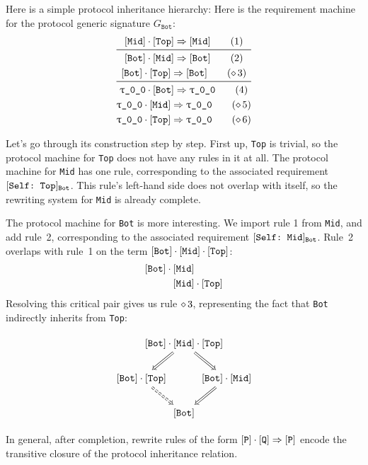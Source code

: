 \documentclass[../generics]{subfiles}
\begin{document}
\begin{example}\label{ex:protocol inheritance completion}
Here is a simple protocol inheritance hierarchy:
Here is the requirement machine for the protocol generic signature $G_{\texttt{Bot}}$:
\begin{gather*}
\ProtoInherit{Mid}{Top}\tag{1}\\
\midrule
\ProtoInherit{Bot}{Mid}\tag{2}\\
\ProtoInherit{Bot}{Top}\tag{$\CRule{3}$}\\
\midrule
\ProtoConf{\rT}{Bot}\tag{4}\\
\ProtoConf{\rT}{Mid}\tag{$\CRule{5}$}\\
\ProtoConf{\rT}{Top}\tag{$\CRule{6}$}
\end{gather*}

Let's go through its construction step by step. First up, \texttt{Top} is trivial, so the protocol machine for \texttt{Top} does not have any rules in it at all. The protocol machine for \texttt{Mid} has one rule, corresponding to the associated requirement $[\texttt{Self:~Top}]_{\texttt{Bot}}$. This rule's left-hand side does not overlap with itself, so the rewriting system for \texttt{Mid} is already complete.

The protocol machine for \texttt{Bot} is more interesting. We import rule 1 from \texttt{Mid}, and add rule~2, corresponding to the associated requirement $[\texttt{Self:~Mid}]_{\texttt{Bot}}$. Rule~2 overlaps with rule~1 on the term $[\texttt{Bot}] \cdot [\texttt{Mid}] \cdot [\texttt{Top}]$:
\begin{align*}
[\texttt{Bot}]\cdot{}&[\texttt{Mid}]\\
&[\texttt{Mid}]\cdot[\texttt{Top}]
\end{align*}
Resolving this critical pair gives us rule $\diamond\, 3$, representing the fact that \texttt{Bot} indirectly inherits from \texttt{Top}:
\begin{ceqn}
\[
\begin{tikzcd}[column sep=-3em]
& \protosym{Bot} \cdot \protosym{Mid} \cdot \protosym{Top}
\arrow[ld, Rightarrow]\arrow[rd, Rightarrow] \\
\protosym{Bot} \cdot \protosym{Top} \arrow[rd, Rightarrow, dashed] && \protosym{Bot} \cdot \protosym{Mid} \arrow[ld, Rightarrow] \\
& \protosym{Bot}
\end{tikzcd}
\]
\end{ceqn}

In general, after completion, rewrite rules of the form $[\texttt{P}]\cdot[\texttt{Q}]\Rightarrow[\texttt{P}]$ encode the transitive closure of the protocol inheritance relation.


\end{example}
\end{document}
